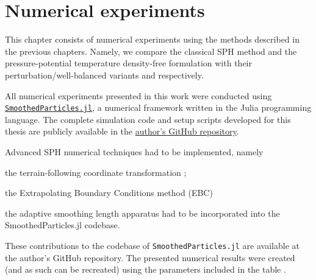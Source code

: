 \documentclass[../main.tex]{subfiles}
\begin{document}
\chapter{Numerical experiments}
\label{chap:EXPERIMENTS}
This chapter consists of numerical experiments using the methods described in the previous chapters. Namely, we compare the classical SPH method  and the pressure-potential temperature density-free formulation  with their perturbation/well-balanced variants  and  respectively.

All numerical experiments presented in this work were conducted using \href{https://github.com/OndrejKincl/SmoothedParticles.jl}{\texttt{SmoothedParticles.jl}}, a numerical framework written in the Julia programming language. The complete simulation code and setup scripts developed for this thesis are publicly available in the \href{https://github.com/kamilbelan/sph-mountain-waves}{author's GitHub repository}.

Advanced SPH numerical techniques had to be implemented, namely
\begin{compactitem}
	\item the terrain-following coordinate transformation \autocite{clarkSmallscaleDynamicModel1977,gal-chenUseCoordinateTransformation1975};
	\item the Extrapolating Boundary Conditions method (EBC) \autocite{vacondioGrandChallengesSmoothed2021a} 
	\item the adaptive smoothing length apparatus had to be incorporated into the SmoothedParticles.jl codebase.
\end{compactitem}

These contributions to the codebase of \texttt{SmoothedParticles.jl} are available at the author's GitHub repository. The presented numerical results were created (and as such can be recreated) using the parameters included in the table .
\end{document}
